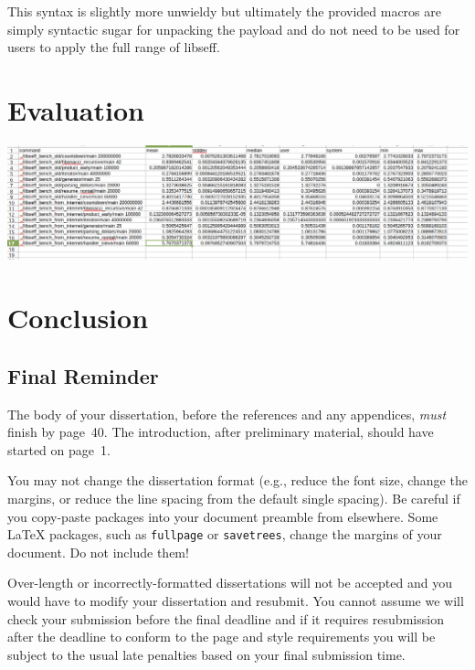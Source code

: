 \documentclass[logo,bsc,singlespacing,parskip,online]{infthesis}
\begin{document}
This syntax is slightly more unwieldy but ultimately the provided macros are simply syntactic sugar for unpacking the payload and do not need to be used for users to apply the full range of libseff.

\chapter{Evaluation}

\includegraphics[scale=0.3]{table.png}

\chapter{Conclusion}

\section{Final Reminder}

The body of your dissertation, before the references and any appendices,
\emph{must} finish by page~40. The introduction, after preliminary material,
should have started on page~1.

You may not change the dissertation format (e.g., reduce the font size, change
the margins, or reduce the line spacing from the default single spacing). Be
careful if you copy-paste packages into your document preamble from elsewhere.
Some \LaTeX{} packages, such as \texttt{fullpage} or \texttt{savetrees}, change
the margins of your document. Do not include them!

Over-length or incorrectly-formatted dissertations will not be accepted and you
would have to modify your dissertation and resubmit. You cannot assume we will
check your submission before the final deadline and if it requires resubmission
after the deadline to conform to the page and style requirements you will be
subject to the usual late penalties based on your final submission time.

% 




\appendix
\end{document}
